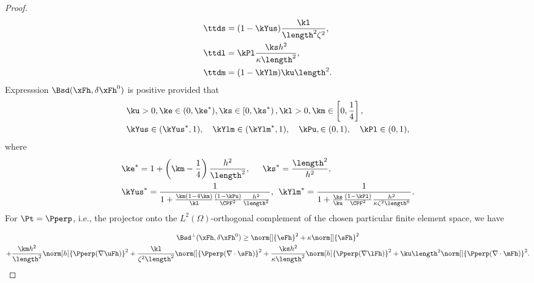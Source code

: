 \begin{proof}
\begin{align*}
    \ttds &= (1-\kYus)\frac{\kl}{\length^2\zeta^2},\\
    \ttdl &= \kPl\frac{\ks h^2}{\kappa\length^2},\\
    \ttdm &= (1-\kYlm)\ku \length^2.
\end{align*}
Expresssion $\Bsd(\xFh,\delta\xFh^0)$ is positive provided that
\begin{align*}   
& \ku> 0,\ke\in(0,\ke^*),\ks\in\left[0,\ks^*\right),\kl > 0,\km\in\left[0,\frac14\right],\\
& \kYus\in(\kYus^*,1),\quad 
\kYlm\in(\kYlm^*,1),\quad
\kPu,\in(0,1),\quad
\kPl\in(0, 1),
\end{align*}
where
\begin{align*}
& \ke^* = 1+\left(\km-\frac14\right)\frac{h^2}{\length^2},\quad
\:\:
\ks^* = \frac{\length^2}{h^2}, \\
& \kYus^* = \frac{1}{1+\frac{\km (1-4\km)}{\kl}\frac{(1-\kPu)}{\CPF^2}\frac{h^2}{\length^2}}, 
\:\:
\kYlm^* = \frac{1}{1+\frac{\ks}{\ku}\frac{(1-\kPl)}{\CPF^2}\frac{h^2}{\kappa\zeta^2\length^6}}.
\end{align*}
For $\Pt = \Pperp$, i.e., the projector onto the $L^2(\Omega)$-orthogonal complement of the chosen particular finite element space, we have

\begin{multline*}
\Bsd^\perp(\xFh,\delta\xFh^0) \geq 
    \norm[]{\eFh}^2+
    \kappa\norm[]{\sFh}^2\\
    +\frac{\km h^2}{\length^2}\norm[h]{\Pperp(\nabla\uFh)}^2+
    \frac{\kl}{\zeta^2\length^2}\norm[]{\Pperp(\nabla\cdot\sFh)}^2 
    + \frac{\ks h^2}{\kappa\length^2}\norm[h]{\Pperp(\nabla\lFh)}^2+
    \ku\length^2\norm[]{\Pperp(\nabla\cdot\mFh)}^2.
\end{multline*}

\end{proof}

